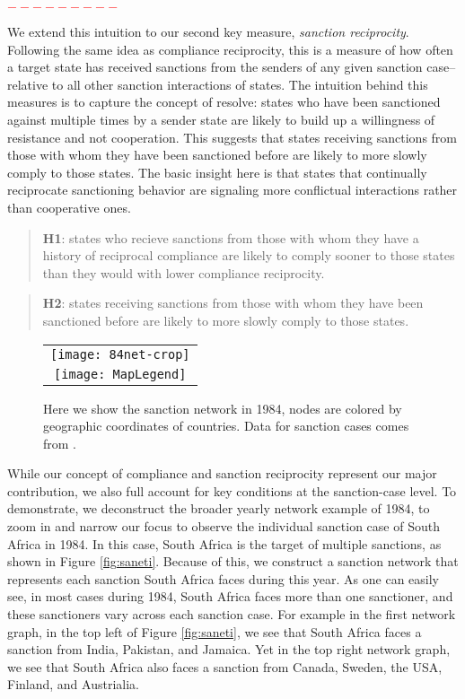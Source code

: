 \textcolor{red}{$---------$}

We extend this intuition to our second key measure, \textit{sanction reciprocity}. Following the same idea as compliance reciprocity, this is a measure of how often a target state has received sanctions from the senders of any given sanction case--relative to all other sanction interactions of states. The intuition behind this measures is to capture the concept of resolve: states who have been sanctioned against multiple times by a sender state are likely to build up a willingness of resistance and not cooperation.  This suggests that states receiving sanctions from those with whom they have been sanctioned before are likely to more slowly comply to those states. The basic insight here is that states that continually reciprocate sanctioning behavior are signaling more conflictual interactions rather than cooperative ones. 

\begin{quote}
	\textbf{H1}: states who recieve sanctions from those with whom they have a history of reciprocal compliance are likely to comply sooner to those states than they would with lower compliance reciprocity. 
\end{quote}


\begin{quote}
	\textbf{H2}: states receiving sanctions from those with whom they have been sanctioned before are likely to more slowly comply to those states.
\end{quote}

\begin{figure}[ht]
  \centering
  \begin{tabular}{c}
	  \texttt{[image: 84net-crop]} \\
	  \texttt{[image: MapLegend]}
  \end{tabular}
  \caption{Here we show the sanction network in 1984, nodes are colored by geographic coordinates of countries. Data for sanction cases comes from \citet{morgan2009threat}.}
  \label{fig:spaghetti}
\end{figure}
\FloatBarrier

While our concept of compliance and sanction reciprocity represent our major contribution, we also full account for key conditions at the sanction-case level. To demonstrate, we deconstruct the broader yearly network example of 1984, to zoom in and narrow our focus to observe the individual sanction case of South Africa in 1984. In this case, South Africa is the target of multiple sanctions, as shown in Figure \ref{fig:saneti}. Because of this, we construct a sanction network that represents each sanction South Africa faces during this year. As one can easily see, in most cases during 1984, South Africa faces more than one sanctioner, and these sanctioners vary across each sanction case. For example in the first network graph, in the top left of Figure \ref{fig:saneti}, we see that South Africa faces a sanction from India, Pakistan, and Jamaica. Yet in the top right network graph, we see that South Africa also faces a sanction from Canada, Sweden, the USA, Finland, and Austrialia. 

